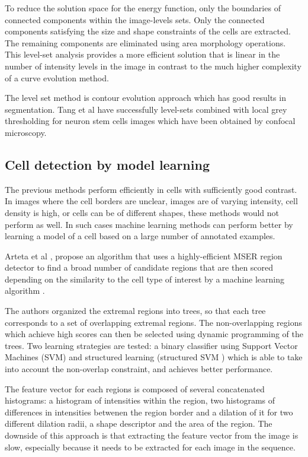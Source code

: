 \documentclass[12pt,a4paper,openany]{book}
\begin{document}
To reduce the solution space for the energy function, only the boundaries of connected components within the image-levels sets. Only the connected components satisfying the size and shape constraints of the cells are extracted. The remaining components are eliminated using area morphology operations. This level-set analysis provides a more efficient solution that is linear in the number of intensity levels in the image in contrast to the much higher complexity of a curve evolution method.

The level set method is contour evolution approach which has good results in segmentation. Tang et al \cite{Tang??} have successfully level-sets combined with local grey thresholding \cite{xu10} for neuron stem cells images which have been obtained by confocal microscopy.

\subsection{Cell detection by model learning}

The previous methods perform efficiently in cells with sufficiently good contrast. In images where the cell borders are unclear, images are of varying intensity, cell density is high, or cells can be of different shapes, these methods would not perform as well. In such cases machine learning methods can perform better by learning a model of a cell based on a large number of annotated examples.

Arteta et al \cite{arteta12}\cite{arteta13},  propose an algorithm that uses a highly-efficient MSER region detector \cite{matas02} to find a broad number of candidate regions that are then scored depending on the similarity to the cell type of interest by a machine learning algorithm . 

The authors organized the extremal regions into trees, so that each tree corresponds to a set of overlapping extremal regions. The non-overlapping regions which achieve high scores can then be selected using dynamic programming of the trees. Two learning strategies are tested: a binary classifier using Support Vector Machines (SVM) and structured learning (structured SVM \cite{joachims09}) which is able to take into account the non-overlap constraint, and achieves better performance.

The feature vector for each regions is composed of several concatenated histograms: a histogram of intensities within the region, two histograms of differences in intensities betwenen the region border and a dilation of it for two different dilation radii, a shape descriptor and the area of the region. The downside of this approach is that extracting the feature vector from the image is slow, especially because it needs to be extracted for each image in the sequence.
\end{document}
